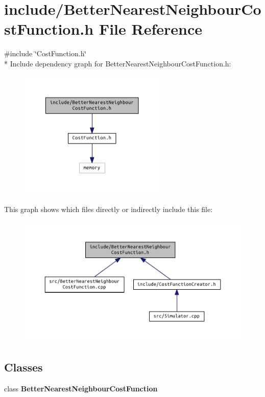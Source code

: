 \section{include/\+Better\+Nearest\+Neighbour\+Cost\+Function.h File Reference}
\label{_better_nearest_neighbour_cost_function_8h}
{\ttfamily \#include \char`\"{}Cost\+Function.\+h\char`\"{}}\\*
Include dependency graph for Better\+Nearest\+Neighbour\+Cost\+Function.\+h\+:
\nopagebreak
\begin{figure}[H]
\begin{center}
\leavevmode
\includegraphics[width=199pt]{_better_nearest_neighbour_cost_function_8h__incl}
\end{center}
\end{figure}
This graph shows which files directly or indirectly include this file\+:
\nopagebreak
\begin{figure}[H]
\begin{center}
\leavevmode
\includegraphics[width=350pt]{_better_nearest_neighbour_cost_function_8h__dep__incl}
\end{center}
\end{figure}
\subsection*{Classes}
\begin{DoxyCompactItemize}
\item 
class {\bf Better\+Nearest\+Neighbour\+Cost\+Function}
\end{DoxyCompactItemize}
